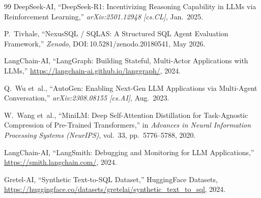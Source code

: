 \documentclass[conference]{IEEEtran}
\begin{document}
\begin{thebibliography}{99}
DeepSeek-AI,
``DeepSeek-R1: Incentivizing Reasoning Capability in LLMs via
  Reinforcement Learning,''
\emph{arXiv:2501.12948 [cs.CL]}, Jan.\ 2025.

P.~Tivhale,
``NexusSQL / SQLAS: A Structured SQL Agent Evaluation Framework,''
\emph{Zenodo}, DOI:\,10.5281/zenodo.20180541, May 2026.

LangChain-AI,
``LangGraph: Building Stateful, Multi-Actor Applications with LLMs,''
\url{https://langchain-ai.github.io/langgraph/}, 2024.

Q.~Wu et~al.,
``AutoGen: Enabling Next-Gen LLM Applications via Multi-Agent
  Conversation,''
\emph{arXiv:2308.08155 [cs.AI]}, Aug.\ 2023.

W.~Wang et~al.,
``MiniLM: Deep Self-Attention Distillation for Task-Agnostic
  Compression of Pre-Trained Transformers,''
in \emph{Advances in Neural Information Processing Systems (NeurIPS)},
vol.~33, pp.~5776--5788, 2020.

LangChain-AI,
``LangSmith: Debugging and Monitoring for LLM Applications,''
\url{https://smith.langchain.com/}, 2024.

Gretel-AI,
``Synthetic Text-to-SQL Dataset,''
HuggingFace Datasets,
\url{https://huggingface.co/datasets/gretelai/synthetic_text_to_sql},
2024.

\end{thebibliography}

\end{document}
